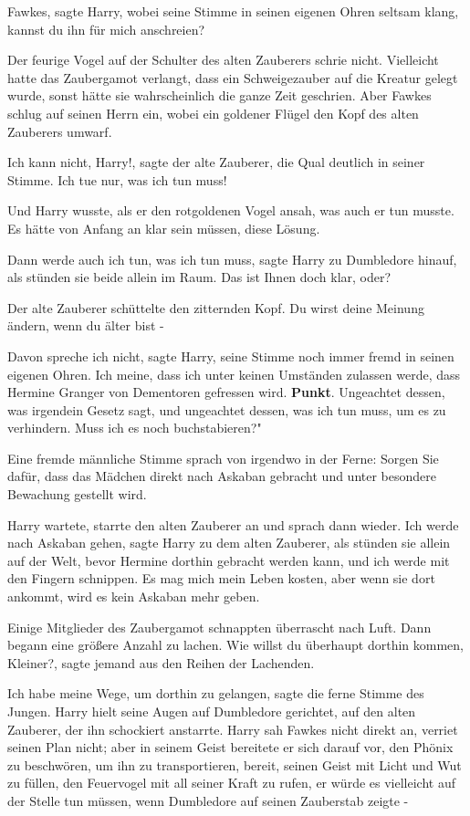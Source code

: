 \glqq Fawkes\grqq{}, sagte Harry, wobei seine Stimme in seinen eigenen Ohren
seltsam klang, \glqq kannst du ihn für mich anschreien?\grqq{}

Der feurige Vogel auf der Schulter des alten Zauberers schrie nicht. Vielleicht
hatte das Zaubergamot verlangt, dass ein Schweigezauber auf die Kreatur gelegt
wurde, sonst hätte sie wahrscheinlich die ganze Zeit geschrien. Aber Fawkes
schlug auf seinen Herrn ein, wobei ein goldener Flügel den Kopf des alten
Zauberers umwarf.

\glqq Ich kann nicht, Harry!\grqq{}, sagte der alte Zauberer, die Qual deutlich
in seiner Stimme. \glqq Ich tue nur, was ich tun muss!\grqq{}

Und Harry wusste, als er den rotgoldenen Vogel ansah, was auch er tun musste. Es
hätte von Anfang an klar sein müssen, diese Lösung.

\glqq Dann werde auch ich tun, was ich tun muss\grqq{}, sagte Harry zu
Dumbledore hinauf, als stünden sie beide allein im Raum. \glqq Das ist Ihnen
doch klar, oder?\grqq{}

Der alte Zauberer schüttelte den zitternden Kopf. \glqq Du wirst deine Meinung
ändern, wenn du älter bist -\grqq{}

\glqq Davon spreche ich nicht\grqq{}, sagte Harry, seine Stimme noch immer fremd
in seinen eigenen Ohren. \glqq Ich meine, dass ich unter keinen Umständen
zulassen werde, dass Hermine Granger von Dementoren gefressen wird.
\textbf{Punkt}. Ungeachtet dessen, was irgendein Gesetz sagt, und ungeachtet
dessen, was ich tun muss, um es zu verhindern. Muss ich es noch buchstabieren?"

Eine fremde männliche Stimme sprach von irgendwo in der Ferne: \glqq Sorgen Sie
dafür, dass das Mädchen direkt nach Askaban gebracht und unter besondere
Bewachung gestellt wird.\grqq{}

Harry wartete, starrte den alten Zauberer an und sprach dann wieder. \glqq Ich
werde nach Askaban gehen\grqq{}, sagte Harry zu dem alten Zauberer, als stünden
sie allein auf der Welt, \glqq bevor Hermine dorthin gebracht werden kann, und
ich werde mit den Fingern schnippen. Es mag mich mein Leben kosten, aber wenn
sie dort ankommt, wird es kein Askaban mehr geben.\grqq{}

Einige Mitglieder des Zaubergamot schnappten überrascht nach Luft. Dann begann
eine größere Anzahl zu lachen. \glqq Wie willst du überhaupt dorthin kommen,
Kleiner?\grqq{}, sagte jemand aus den Reihen der Lachenden.

\glqq Ich habe meine Wege, um dorthin zu gelangen\grqq{}, sagte die ferne Stimme
des Jungen. Harry hielt seine Augen auf Dumbledore gerichtet, auf den alten
Zauberer, der ihn schockiert anstarrte. Harry sah Fawkes nicht direkt an,
verriet seinen Plan nicht; aber in seinem Geist bereitete er sich darauf vor,
den Phönix zu beschwören, um ihn zu transportieren, bereit, seinen Geist mit
Licht und Wut zu füllen, den Feuervogel mit all seiner Kraft zu rufen, er würde
es vielleicht auf der Stelle tun müssen, wenn Dumbledore auf seinen Zauberstab
zeigte -

